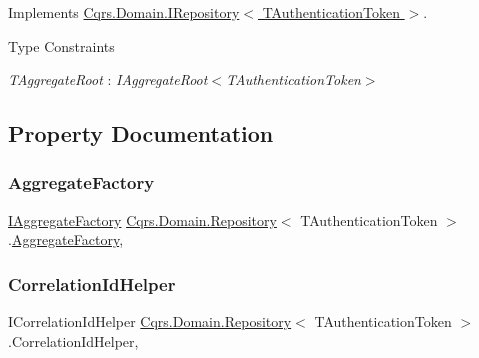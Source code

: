 Implements \hyperlink{interfaceCqrs_1_1Domain_1_1IRepository_a6086f15a0fef4982da553d24aee04015}{Cqrs.\+Domain.\+I\+Repository$<$ T\+Authentication\+Token $>$}.

\begin{Desc}
\item[Type Constraints]\begin{description}
\item[{\em T\+Aggregate\+Root} : {\em I\+Aggregate\+Root$<$T\+Authentication\+Token$>$}]\end{description}
\end{Desc}


\subsection{Property Documentation}
\mbox{\label{classCqrs_1_1Domain_1_1Repository_a02cee15b1d3f603c1ae437b366e83085}} 
\subsubsection{\texorpdfstring{Aggregate\+Factory}{AggregateFactory}}
{\footnotesize\ttfamily \hyperlink{interfaceCqrs_1_1Domain_1_1Factories_1_1IAggregateFactory}{I\+Aggregate\+Factory} \hyperlink{classCqrs_1_1Domain_1_1Repository}{Cqrs.\+Domain.\+Repository}$<$ T\+Authentication\+Token $>$.\hyperlink{classCqrs_1_1Domain_1_1Factories_1_1AggregateFactory}{Aggregate\+Factory}\hspace{0.3cm}{\ttfamily [get]}, {\ttfamily [protected]}}

\mbox{\label{classCqrs_1_1Domain_1_1Repository_a3504ed9a3ff1c689ba89c574619893af}} 
\subsubsection{\texorpdfstring{Correlation\+Id\+Helper}{CorrelationIdHelper}}
{\footnotesize\ttfamily I\+Correlation\+Id\+Helper \hyperlink{classCqrs_1_1Domain_1_1Repository}{Cqrs.\+Domain.\+Repository}$<$ T\+Authentication\+Token $>$.Correlation\+Id\+Helper\hspace{0.3cm}{\ttfamily [get]}, {\ttfamily [protected]}}

